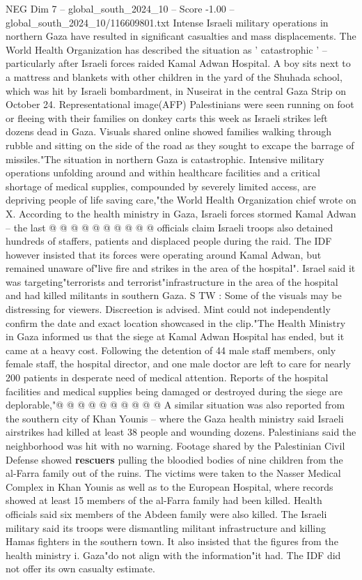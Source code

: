 \begin{textsample}{NEG Dim 7 – global\_south\_2024\_10 – Score -1.00 – global\_south\_2024\_10/116609801.txt}  \label{ex:f7_neg_237}
Intense Israeli military operations in northern Gaza have resulted in significant casualties and mass displacements.
The World Health Organization has described the situation as ' catastrophic ' -- particularly after Israeli forces raided Kamal Adwan Hospital.
A boy sits next to a mattress and blankets with other children in the yard of the Shuhada school, which was hit by Israeli bombardment, in Nuseirat in the central Gaza Strip on October 24.
Representational image(AFP) Palestinians were seen running on foot or fleeing with their families on donkey carts this week as Israeli strikes left dozens dead in Gaza.
Visuals shared online showed families walking through rubble and sitting on the side of the road as they sought to excape the barrage of missiles."The situation in northern Gaza is catastrophic.
Intensive military operations unfolding around and within healthcare facilities and a critical shortage of medical supplies, compounded by severely limited access, are depriving people of life saving care,"the World Health Organization chief wrote on X.
According to the health ministry in Gaza, Israeli forces stormed Kamal Adwan -- the last @ @ @ @ @ @ @ @ @ @ officials claim Israeli troops also detained hundreds of staffers, patients and displaced people during the raid.
The IDF however insisted that its forces were operating around Kamal Adwan, but remained unaware of"live fire and strikes in the area of the hospital".
Israel said it was targeting"terrorists and terrorist"infrastructure in the area of the hospital and had killed militants in southern Gaza.
S TW : Some of the visuals may be distressing for viewers.
Discreetion is advised.
Mint could not independently confirm the date and exact location showcased in the clip."The Health Ministry in Gaza informed us that the siege at Kamal Adwan Hospital has ended, but it came at a heavy cost.
Following the detention of 44 male staff members, only female staff, the hospital director, and one male doctor are left to care for nearly 200 patients in desperate need of medical attention.
Reports of the hospital facilities and medical supplies being damaged or destroyed during the siege are deplorable,"@ @ @ @ @ @ @ @ @ @ A similar situation was also reported from the southern city of Khan Younis -- where the Gaza health ministry said Israeli airstrikes had killed at least 38 people and wounding dozens.
Palestinians said the neighborhood was hit with no warning.
Footage shared by the Palestinian Civil Defense showed \textbf{rescuers} pulling the bloodied bodies of nine children from the al-Farra family out of the ruins.
The victims were taken to the Nasser Medical Complex in Khan Younis as well as to the European Hospital, where records showed at least 15 members of the al-Farra family had been killed.
Health officials said six members of the Abdeen family were also killed.
The Israeli military said its troops were dismantling militant infrastructure and killing Hamas fighters in the southern town.
It also insisted that the figures from the health ministry i.
Gaza"do not align with the information"it had.
The IDF did not offer its own casualty estimate.

\end{textsample}
